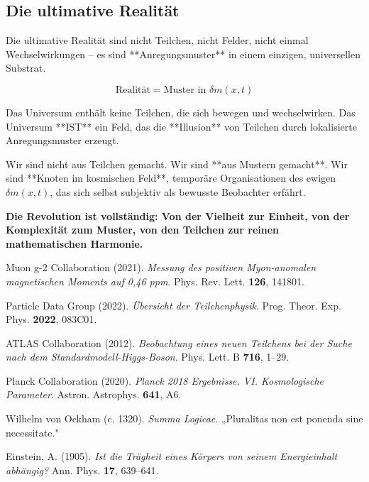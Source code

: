\documentclass[12pt,a4paper]{article}
\newcommand{\deltam}{\delta m}
\theoremstyle{definition}
\theoremstyle{remark}
\begin{document}
	\subsection{Die ultimative Realität}
	
	Die ultimative Realität sind nicht Teilchen, nicht Felder, nicht einmal Wechselwirkungen -- es sind **Anregungsmuster** in einem einzigen, universellen Substrat.
	
	\begin{equation}
		\boxed{\text{Realität} = \text{Muster in } \deltam(x,t)}
	\end{equation}
	
	Das Universum enthält keine Teilchen, die sich bewegen und wechselwirken. Das Universum **IST** ein Feld, das die **Illusion** von Teilchen durch lokalisierte Anregungsmuster erzeugt.
	
	Wir sind nicht aus Teilchen gemacht. Wir sind **aus Mustern gemacht**. Wir sind **Knoten im kosmischen Feld**, temporäre Organisationen des ewigen $\deltam(x,t)$, das sich selbst subjektiv als bewusste Beobachter erfährt.
	
	\textbf{Die Revolution ist vollständig: Von der Vielheit zur Einheit, von der Komplexität zum Muster, von den Teilchen zur reinen mathematischen Harmonie.}
	
	\begin{thebibliography}{99}
		
		Muon g-2 Collaboration (2021). \textit{Messung des positiven Myon-anomalen magnetischen Moments auf 0{,}46 ppm}. Phys. Rev. Lett. \textbf{126}, 141801.
		
		Particle Data Group (2022). \textit{Übersicht der Teilchenphysik}. Prog. Theor. Exp. Phys. \textbf{2022}, 083C01.
		
		ATLAS Collaboration (2012). \textit{Beobachtung eines neuen Teilchens bei der Suche nach dem Standardmodell-Higgs-Boson}. Phys. Lett. B \textbf{716}, 1--29.
		
		Planck Collaboration (2020). \textit{Planck 2018 Ergebnisse. VI. Kosmologische Parameter}. Astron. Astrophys. \textbf{641}, A6.
		
		Wilhelm von Ockham (c. 1320). \textit{Summa Logicae}. „Pluralitas non est ponenda sine necessitate."
		
		Einstein, A. (1905). \textit{Ist die Trägheit eines Körpers von seinem Energieinhalt abhängig?} Ann. Phys. \textbf{17}, 639--641.
		
	\end{thebibliography}
	
	
\end{document}
